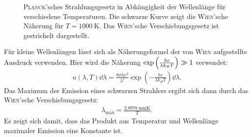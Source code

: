 \documentclass[a4paper,twoside,final]{article}
\begin{document}
\begin{figure}[htp]
  \centering
  \caption{\textsc{Planck}'sches Strahlungsgesetz in Abhängigkeit der Wellenlänge für verschiedene Temperaturen. Die schwarze Kurve zeigt die \textsc{Wien}'sche Näherung für $T=\SI{1000}{\kelvin}$. Das \textsc{Wien}'sche Verschiebungsgesetz ist gestrichelt dargestellt.}
\end{figure}
Für kleine Wellenlängen lässt sich als Näherungsformel der von \textsc{Wien} aufgestellte Ausdruck verwenden. Hier wird die Näherung $\exp\qty(\frac{hc}{\lambda k_B T}) \gg 1$ verwendet:
\begin{align}
  u(\lambda,T)\dd{\lambda} = \frac{8\pi h c^2}{\lambda^5}\exp(-\frac{hc}{\lambda k_B T})\dd{\lambda}.
\end{align}
Das Maximum der Emission eines schwarzen Strahlers ergibt sich dann durch das \textsc{Wien}'sche Verschiebungsgesetz:
\begin{align}
  \lambda_\text{max} = \frac{\SI{2.8978}{\milli\metre\kelvin}}{T}.
\end{align}
Es zeigt sich damit, dass das Produkt aus Temperatur und Wellenlänge maximaler Emission eine Konstante ist.
\end{document}
